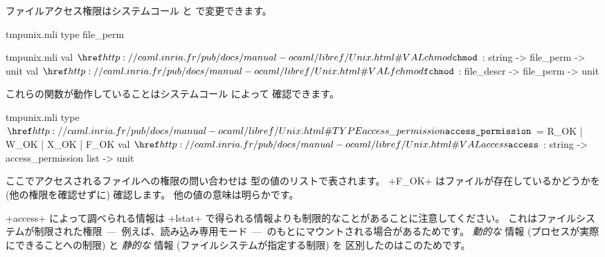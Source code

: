 ファイルアクセス権限はシステムコール  と  で変更できます。
%
\begin{codefile}{tmpunix.mli}
type file_perm
\end{codefile}
%
\begin{listingcodefile}{tmpunix.mli}
val $\libvalue{Unix}{chmod}$ : string -> file_perm -> unit
val $\libvalue{Unix}{fchmod}$ : file_descr -> file_perm -> unit
\end{listingcodefile}
これらの関数が動作していることはシステムコール  によって  確認できます。
%
\begin{listingcodefile}{tmpunix.mli}
type $\libtype{Unix}{access\_permission}$ = R_OK | W_OK | X_OK | F_OK
val $\libvalue{Unix}{access}$ : string -> access_permission list -> unit
\end{listingcodefile}
%
ここでアクセスされるファイルへの権限の問い合わせは  型の値のリストで表されます。
\ml+F_OK+ はファイルが存在しているかどうかを (他の権限を確認せずに) 確認します。
他の値の意味は明らかです。

\ml+access+ によって調べられる情報は \ml+lstat+ で得られる情報よりも制限的なことがあることに注意してください。
これはファイルシステムが制限された権限~---~例えば、読み込み専用モード~---~のもとにマウントされる場合があるためです。
\emph{動的な} 情報 (プロセスが実際にできることへの制限) と \emph{静的な} 情報 (ファイルシステムが指定する制限) を
区別したのはこのためです。

